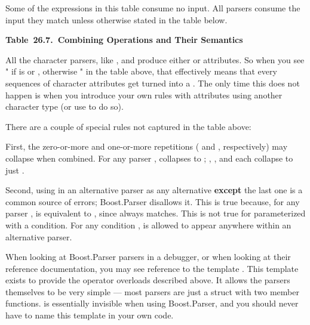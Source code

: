 \documentclass{MyBook}
\begin{document}
\begin{marker}[title=Note ]
Some of the expressions in this table consume no input. All parsers consume the input they match unless otherwise stated in the table below. 
\end{marker}

\textbf{Table~26.7.~Combining Operations and Their Semantics}



\hfill\break

\begin{marker}[title=Important ]
All the character parsers, like ,  and  produce either  or  attributes. So when you see " if \emph{} is  or , otherwise \emph{}" in the table above, that effectively means that every sequences of character attributes get turned into a . The only time this does not happen is when you introduce your own rules with attributes using another character type (or use  to do so). 
\end{marker}

There are a couple of special rules not captured in the table above:

First, the zero-or-more and one-or-more repetitions ( and , respectively) may collapse when combined. For any parser ,  collapses to ; , , and  each collapse to just .

Second, using  in an alternative parser as any alternative \textbf{except} the last one is a common source of errors; Boost.Parser disallows it. This is true because, for any parser ,  is equivalent to , since  always matches. This is not true for  parameterized with a condition. For any condition ,  is allowed to appear anywhere within an alternative parser.

\begin{marker}[title=Note ]
When looking at Boost.Parser parsers in a debugger, or when looking at their reference documentation, you may see reference to the template . This template exists to provide the operator overloads described above. It allows the parsers themselves to be very simple --- most parsers are just a struct with two member functions.  is essentially invisible when using Boost.Parser, and you should never have to name this template in your own code. 
\end{marker}
\end{document}
